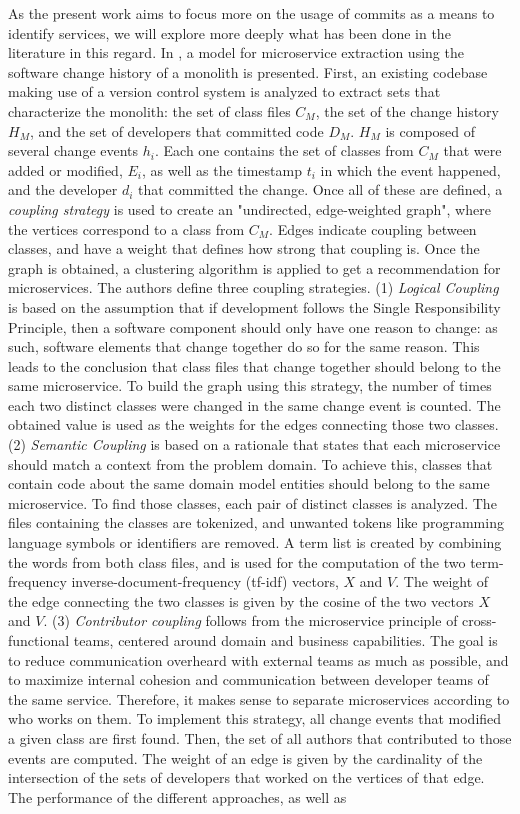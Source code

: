 As the present work aims to focus more on the usage of commits as a means to identify services, we will explore more deeply what has been done in the literature in this regard. In \cite{Mazlami_2017}, a model for microservice extraction using the software change history of a monolith is presented. First, an existing codebase making use of a version control system is analyzed to extract sets that characterize the monolith: the set of class files $C_M$, the set of the change history $H_M$, and the set of developers that committed code $D_M$. $H_M$ is composed of several change events $h_i$. Each one contains the set of classes from $C_M$ that were added or modified, $E_i$, as well as the timestamp $t_i$ in which the event happened, and the developer $d_i$ that committed the change. Once all of these are defined, a \textit{coupling strategy} is used to create an "undirected, edge-weighted graph", where the vertices correspond to a class from $C_M$. Edges indicate coupling between classes, and have a weight that defines how strong that coupling is. Once the graph is obtained, a clustering algorithm is applied to get a recommendation for microservices. The authors define three coupling strategies. (1) \textit{Logical Coupling} is based on the assumption that if development follows the Single Responsibility Principle, then a software component should only have one reason to change: as such, software elements that change together do so for the same reason. This leads to the conclusion that class files that change together should belong to the same microservice. To build the graph using this strategy, the number of times each two distinct classes were changed in the same change event is counted. The obtained value is used as the weights for the edges connecting those two classes. (2) \textit{Semantic Coupling} is based on a rationale that states that each microservice should match a context from the problem domain. To achieve this, classes that contain code about the same domain model entities should belong to the same microservice. To find those classes, each pair of distinct classes is analyzed. The files containing the classes are tokenized, and unwanted tokens like programming language symbols or identifiers are removed. A term list is created by combining the words from both class files, and is used for the computation of the two term-frequency inverse-document-frequency (tf-idf) vectors, $X$ and $V$. The weight of the edge connecting the two classes is given by the cosine of the two vectors $X$ and $V$. (3) \textit{Contributor coupling} follows from the microservice principle of cross-functional teams, centered around domain and business capabilities. The goal is to reduce communication overheard with external teams as much as possible, and to maximize internal cohesion and communication between developer teams of the same service. Therefore, it makes sense to separate microservices according to who works on them. To implement this strategy, all change events that modified a given class are first found. Then, the set of all authors that contributed to those events are computed. The weight of an edge is given by the cardinality of the intersection of the sets of developers that worked on the vertices of that edge. The performance of the different approaches, as well as 